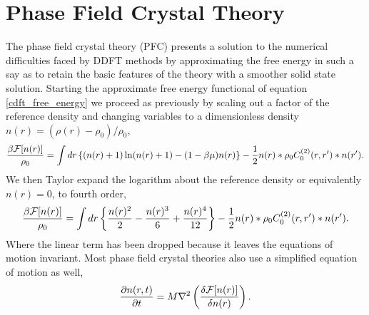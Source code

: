 \section{Phase Field Crystal Theory} %

The phase field crystal theory (PFC) presents a solution to the numerical difficulties
faced by DDFT methods by approximating the free energy in such a say as to retain the
basic features of the theory with a smoother solid state solution. Starting the 
approximate free energy functional of equation \ref{cdft_free_energy} we proceed as
previously by scaling out a factor of the reference density and changing variables
to a dimensionless density $n(r) = (\rho(r) - \rho_0) / \rho_0$,
%
\begin{equation}
    \frac{\beta \mathcal{F}[n(r)]}{\rho_0} = 
        \int dr \left\lbrace (n(r) + 1) \ln( n(r) + 1) - (1 - \beta\mu)n(r) \right\rbrace
        - \frac{1}{2} n(r) \ast \rho_0 C^{(2)}_0(r, r^\prime) \ast n(r^\prime).
\end{equation}
%
We then Taylor expand the logarithm about the reference density or equivalently $n(r) = 0$, 
to fourth order,
%
\begin{equation}
    \label{pfc_free_energy} 
    \frac{\beta \mathcal{F}[n(r)]}{\rho_0} =
        \int dr \left\lbrace \frac{n(r)^2}{2} - \frac{n(r)^3}{6} + \frac{n(r)^4}{12} \right\rbrace
        -\frac{1}{2} n(r) \ast \rho_0 C^{(2)}_0(r, r^\prime) \ast n(r^\prime).
\end{equation}
%
Where the linear term has been dropped because it leaves the equations of motion invariant.
Most phase field crystal theories also use a simplified equation of motion as well,
%
\begin{equation}
    \label{pfc_eom}
    \frac{\partial n(r, t)}{\partial t} = M \nabla^2 \left(\frac{\delta \mathcal{F}[n(r)]}{\delta n(r)}\right).
\end{equation}
%
